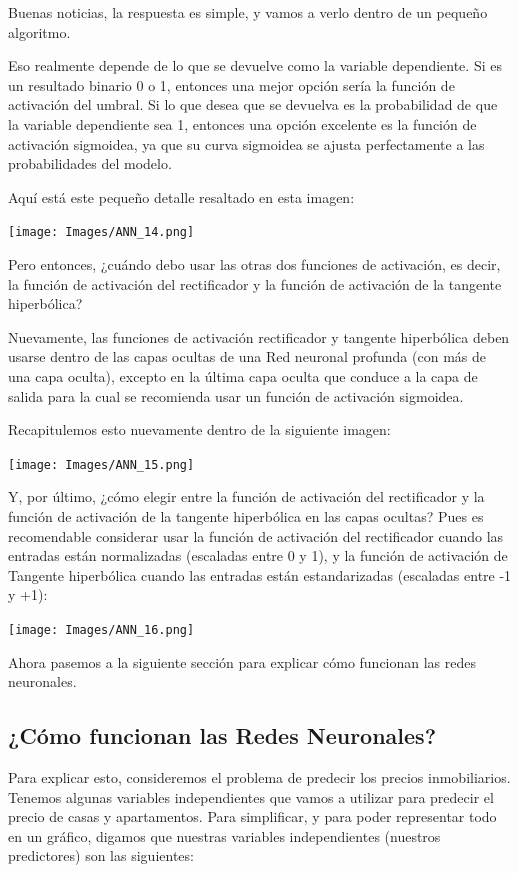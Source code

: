 \documentclass[
]{book}
\begin{document}
Buenas noticias, la respuesta es simple, y vamos a verlo dentro de un pequeño algoritmo.

Eso realmente depende de lo que se devuelve como la variable dependiente. Si es un resultado binario 0 o 1, entonces una mejor opción sería la función de activación del umbral. Si lo que desea que se devuelva es la probabilidad de que la variable dependiente sea 1, entonces una opción excelente es la función de activación sigmoidea, ya que su curva sigmoidea se ajusta perfectamente a las probabilidades del modelo.

Aquí está este pequeño detalle resaltado en esta imagen:

\texttt{[image: Images/ANN\_14.png]}

Pero entonces, ¿cuándo debo usar las otras dos funciones de activación, es decir, la función de activación del rectificador y la función de activación de la tangente hiperbólica?

Nuevamente, las funciones de activación rectificador y tangente hiperbólica deben usarse dentro de las capas ocultas de una Red neuronal profunda (con más de una capa oculta), excepto en la última capa oculta que conduce a la capa de salida para la cual se recomienda usar un función de activación sigmoidea.

Recapitulemos esto nuevamente dentro de la siguiente imagen:

\texttt{[image: Images/ANN\_15.png]}

Y, por último, ¿cómo elegir entre la función de activación del rectificador y la función de activación de la tangente hiperbólica en las capas ocultas? Pues es recomendable considerar usar la función de activación del rectificador cuando las entradas están normalizadas (escaladas entre 0 y 1), y la función de activación de Tangente hiperbólica cuando las entradas están estandarizadas (escaladas entre -1 y +1):

\texttt{[image: Images/ANN\_16.png]}

Ahora pasemos a la siguiente sección para explicar cómo funcionan las redes neuronales.

\hypertarget{cuxf3mo-funcionan-las-redes-neuronales}{%
\subsection{¿Cómo funcionan las Redes Neuronales?}\label{cuxf3mo-funcionan-las-redes-neuronales}}

Para explicar esto, consideremos el problema de predecir los precios inmobiliarios. Tenemos algunas variables independientes que vamos a utilizar para predecir el precio de casas y apartamentos. Para simplificar, y para poder representar todo en un gráfico, digamos que nuestras variables independientes (nuestros predictores) son las siguientes:
\end{document}
